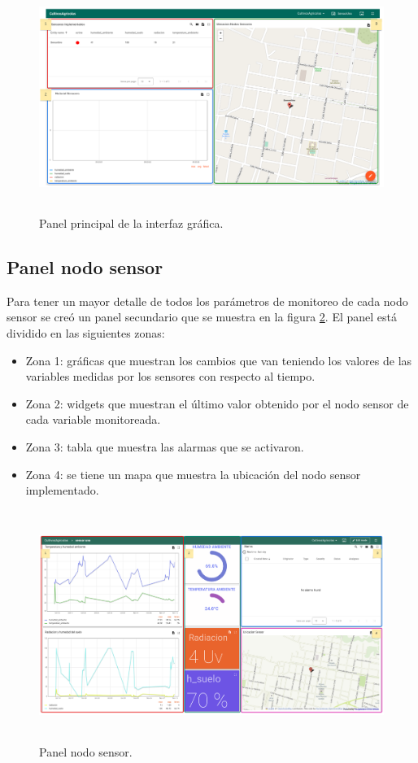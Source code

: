\begin{figure}[h]
  \centering
	\includegraphics[width=\textwidth, height=7.5cm]{./Figures/panel_principal_editado.png}
  \caption{Panel principal de la interfaz gráfica.}
	\label{fig:Panel principal}
\end{figure}

\subsection{Panel nodo sensor} 

Para tener un mayor detalle de todos los parámetros de monitoreo de cada nodo sensor se creó un panel secundario que se muestra en la figura \ref{fig:Panel nodo sensor}. El panel está dividido en las siguientes zonas:
\begin{itemize}
  \item Zona 1: gráficas que muestran los cambios que van teniendo los valores de las variables medidas por los sensores con respecto al tiempo.
  \item Zona 2: widgets que muestran el último valor obtenido por el nodo sensor de cada variable monitoreada.
  \item Zona 3: tabla que muestra las alarmas que se activaron. 
  \item Zona 4: se tiene un mapa que muestra la ubicación del nodo sensor implementado.
\end{itemize}

\begin{figure}[htb!]
  \centering
	\includegraphics[width=\textwidth, height=7.5cm]{./Figures/panel_nodosensor_editado2.png}
  \caption{Panel nodo sensor.}
	\label{fig:Panel nodo sensor}
\end{figure}